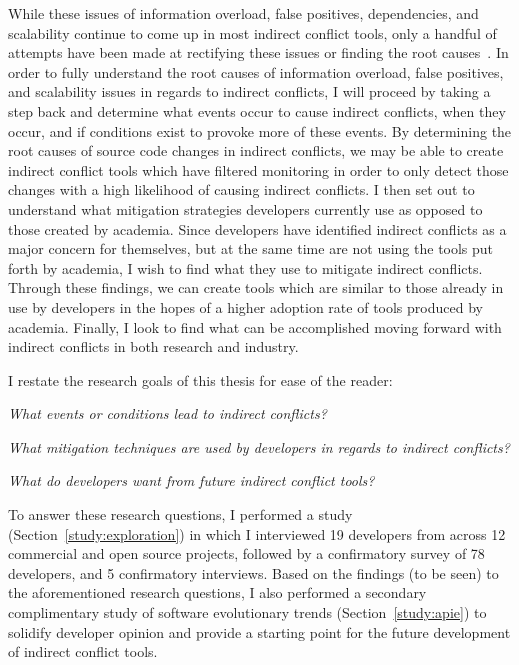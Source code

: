 While these issues of information overload, false positives, dependencies, and scalability continue to come up
in most indirect conflict tools, only a handful of attempts have been made at rectifying these issues or
finding the root causes~\cite{Holmes:2010:CAR,Kim:2011:ESA}. 
In order to fully understand the root causes of information overload, false positives, and
scalability issues in regards to indirect conflicts, I will proceed by taking a step back and determine what events occur to
cause indirect conflicts, when they occur, and if conditions exist to provoke more of these events. By determining the root
causes of source code changes in indirect conflicts, we may be able to create indirect conflict tools which have filtered
monitoring in order to only detect those changes with a high likelihood of causing indirect conflicts.
I then set out to understand what mitigation strategies developers currently use as opposed to those created
by academia. Since developers have identified indirect conflicts as a major concern for themselves, but at
the same time are not using the tools put forth by academia, I wish to find what they use to mitigate indirect
conflicts. Through these findings, we can create tools which are similar to those already in use by developers in
the hopes of a higher adoption rate of tools produced by academia.
Finally, I look to find what can be accomplished moving forward with indirect conflicts
in both research and industry.

I restate the research goals of this thesis for ease of the reader: 

\begin{description}
  \item \textit{What events or conditions lead to indirect conflicts?}
  \item \textit{What mitigation techniques are used by developers in regards to indirect conflicts?}
  \item \textit{What do developers want from future indirect conflict tools?}
\end{description}

To answer these research questions, I performed a study (Section~\ref{study:exploration}) in which I interviewed 19 developers from across 12 commercial and open source projects, 
followed by a confirmatory survey of 78 developers, and 5 confirmatory interviews. Based on the findings (to be seen) to the aforementioned research questions, 
I also performed a secondary complimentary study of software evolutionary trends (Section~\ref{study:apie}) to solidify
developer opinion and provide a starting point for the future development of indirect conflict tools.




